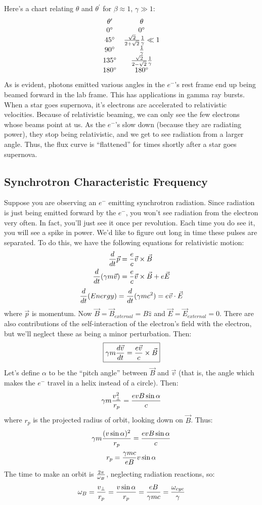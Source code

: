 \documentclass[11pt]{article}
\def\^{\hat}
\def\inv#1{{1 \over #1}}
\def\ddt{{d \over dt}}
\begin{document}
Here's a chart relating $\theta$ and $\theta^\prime$ for $\beta\approx1$,
$\gamma\gg1$:
$$\begin{matrix}
\theta^\prime&\theta\\
0^\circ&0^\circ\\
45^\circ&{\sqrt{2}\over2+\sqrt{2}}{1\over\gamma}\ll1\\
90^\circ&\inv{\gamma}\\
135^\circ&{\sqrt{2}\over2-\sqrt{2}}\inv{\gamma}\\
180^\circ&180^\circ\\
\end{matrix}$$
As is evident, photons emitted various angles in the $e^-$'s rest frame
end up being beamed forward in the lab frame.
This has applications in gamma ray bursts.  When a star goes supernova, 
it's electrons are accelerated to relativistic velocities.  Because of
relativistic beaming, we can only see the few electrons whose beams
point at us.  As the $e^-$'s slow down (because they are radiating power),
they stop being relativistic, and we get to see radiation from a larger
angle.  Thus, the flux curve is ``flattened'' for times shortly after
a star goes supernova.

\subsection*{ Synchrotron Characteristic Frequency}

Suppose you are observing an $e^-$ emitting synchrotron radiation.  Since
radiation is just being emitted forward by the $e^-$, you won't see radiation
from the electron very often.  In fact, you'll just see it once per revolution.
Each time you do see it, you will see a spike in power.  We'd like to figure
out long in time these pulses are separated.  To do this, we have the 
following equations for relativistic motion:
$$\begin{aligned}\ddt\vec p&={e\over c}\vec v\times\vec B\\ 
\ddt(\gamma m\vec v)&={e\over c}\vec v\times\vec B+e\vec E\\ \end{aligned}$$
$$\ddt(Energy)=\ddt(\gamma mc^2)=e\vec v\cdot\vec E$$
where $\vec p$ is momentum.
Now $\vec B=\vec B_{external}=B\^z$ and $\vec E=\vec E_{external}=0$.  There
are also contributions of the self-interaction of the electron's field with
the electron, but we'll neglect these as being a minor perturbation.  Then:
$$\boxed{\gamma m{d\vec v\over dt}=\frac{e\vec v}{c}\times\vec B}$$
Let's define $\alpha$ to be the ``pitch angle'' between $\vec B$ and $\vec v$
(that is, the angle which makes the $e^-$ travel in a helix instead of a 
circle).
Then:
$$\gamma m{v_\perp^2\over r_p}={evB\sin\alpha\over c}$$
where $r_p$ is the projected radius of orbit, looking down on $\vec B$. Thus:
$$\gamma m{(v\sin\alpha)^2\over r_p}={evB\sin\alpha\over c}$$
$$r_p={\gamma mc\over eB}v\sin\alpha$$
The time to make an orbit is ${2\pi\over\omega_B}$, neglecting radiation
reactions, so:
$$\omega_B={v_\perp\over r_p}={v\sin\alpha\over r_p}={eB\over\gamma mc}
={\omega_{cyc}\over\gamma}$$
\end{document}
